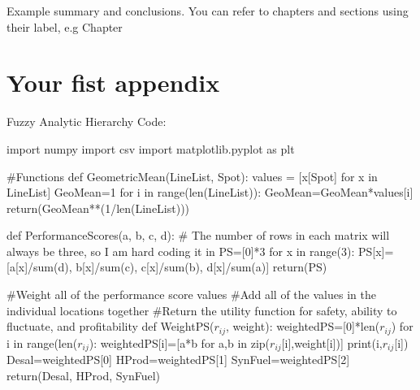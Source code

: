 \documentclass[12pt]{UIdahoMastersThesis}
\begin{document}
Example summary and conclusions. You can refer to chapters and sections using their label, e.g Chapter %


\clearpage
\renewcommand\bibname{References} %
\addcontentsline{toc}{chapter}{\textsc{\bibname}} %





\clearpage
\appendix  %

\chapter{Your fist appendix}
Fuzzy Analytic Hierarchy Code:

import numpy
import csv
import matplotlib.pyplot as plt

\#Functions
def GeometricMean(LineList, Spot):
    values = [x[Spot] for x in LineList]
    GeoMean=1
    for i in range(len(LineList)):
        GeoMean=GeoMean*values[i]
    return(GeoMean**(1/len(LineList)))

def PerformanceScores(a, b, c, d):
    \# The number of rows in each matrix will always be three, so I am hard coding it in
    PS=[0]*3
    for x in range(3):
        PS[x]=[a[x]/sum(d), b[x]/sum(c), c[x]/sum(b), d[x]/sum(a)]
    return(PS)

\#Weight all of the performance score values
\#Add all of the values in the individual locations together
\#Return the utility function for safety, ability to fluctuate, and profitability
def WeightPS($r_{ij}$, weight):
    weightedPS=[0]*len($r_{ij}$)
    for i in range(len($r_{ij}$):
        weightedPS[i]=[a*b for a,b in zip($r_{ij}$[i],weight[i])]
        print(i,$r_{ij}$[i])
    Desal=weightedPS[0]
    HProd=weightedPS[1]
    SynFuel=weightedPS[2]
    return(Desal, HProd, SynFuel)
\end{document}
